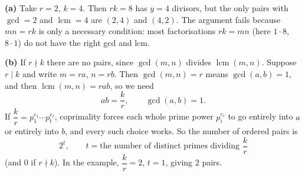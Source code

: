 \textbf{(a)} Take $r=2$, $k=4$. Then $rk=8$ has $y=4$ divisors, but the only pairs with $\gcd=2$ and $\operatorname{lcm}=4$ are $(2,4)$ and $(4,2)$. The argument fails because $mn=rk$ is only a necessary condition: most factorisations $rk=mn$ (here $1\cdot8$, $8\cdot1$) do not have the right gcd and lcm.

\textbf{(b)} If $r\nmid k$ there are no pairs, since $\gcd(m,n)$ divides $\operatorname{lcm}(m,n)$. Suppose $r\mid k$ and write $m=ra$, $n=rb$. Then $\gcd(m,n)=r$ means $\gcd(a,b)=1$, and then $\operatorname{lcm}(m,n)=rab$, so we need
\[
ab=\dfrac {k}{r},\qquad \gcd(a,b)=1 .
\]
If $\dfrac {k}{r}=p_1^{e_1}\cdots p_t^{e_t}$, coprimality forces each whole prime power $p_i^{e_i}$ to go entirely into $a$ or entirely into $b$, and every such choice works. So the number of ordered pairs is
\[
\boxed{2^{t}},\qquad t=\text{the number of distinct primes dividing }\dfrac {k}{r}
\]
(and $0$ if $r\nmid k$). In the example, $\dfrac {k}{r}=2$, $t=1$, giving $2$ pairs.
